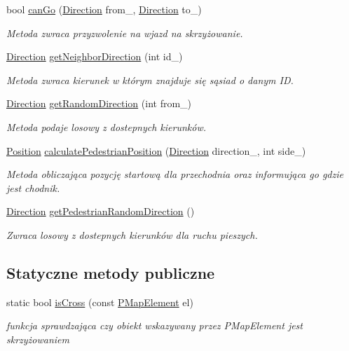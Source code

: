 \begin{DoxyCompactItemize}
bool \hyperlink{class_cross_a9c8223fd7c88d4ebfebf44eec3abfc87}{can\-Go} (\hyperlink{_direction_8h_a224b9163917ac32fc95a60d8c1eec3aa}{Direction} from\-\_\-, \hyperlink{_direction_8h_a224b9163917ac32fc95a60d8c1eec3aa}{Direction} to\-\_\-)
\begin{DoxyCompactList}\small\item\em Metoda zwraca przyzwolenie na wjazd na skrzyżowanie. \end{DoxyCompactList}\item 
\hyperlink{_direction_8h_a224b9163917ac32fc95a60d8c1eec3aa}{Direction} \hyperlink{class_cross_ac1bb07b4ecdaa59c3bc4ef1583424281}{get\-Neighbor\-Direction} (int id\-\_\-)
\begin{DoxyCompactList}\small\item\em Metoda zwraca kierunek w którym znajduje się sąsiad o danym I\-D. \end{DoxyCompactList}\item 
\hyperlink{_direction_8h_a224b9163917ac32fc95a60d8c1eec3aa}{Direction} \hyperlink{class_cross_a034afdc8547efdf62c44e05c276ed601}{get\-Random\-Direction} (int from\-\_\-)
\begin{DoxyCompactList}\small\item\em Metoda podaje losowy z dostepnych kierunków. \end{DoxyCompactList}\item 
\hyperlink{struct_position}{Position} \hyperlink{class_cross_a0e1bc9d7a602cfa4b1ffe22d9748c11c}{calculate\-Pedestrian\-Position} (\hyperlink{_direction_8h_a224b9163917ac32fc95a60d8c1eec3aa}{Direction} direction\-\_\-, int side\-\_\-)
\begin{DoxyCompactList}\small\item\em Metoda obliczająca pozycję startową dla przechodnia oraz informująca go gdzie jest chodnik. \end{DoxyCompactList}\item 
\hyperlink{_direction_8h_a224b9163917ac32fc95a60d8c1eec3aa}{Direction} \hyperlink{class_cross_a34bf1008f626560d8200a9b2b677abb3}{get\-Pedestrian\-Random\-Direction} ()
\begin{DoxyCompactList}\small\item\em Zwraca losowy z dostepnych kierunków dla ruchu pieszych. \end{DoxyCompactList}\end{DoxyCompactItemize}
\subsection*{Statyczne metody publiczne}
\begin{DoxyCompactItemize}
\item 
static bool \hyperlink{class_cross_a50997bb8f3f5fb2b850ec897b1f3912c}{is\-Cross} (const \hyperlink{_types_8h_a4260a5280323637f8a1fa28e89b6ef14}{P\-Map\-Element} el)
\begin{DoxyCompactList}\small\item\em funkcja sprawdzająca czy obiekt wskazywany przez P\-Map\-Element jest skrzyżowaniem \end{DoxyCompactList}\end{DoxyCompactItemize}
